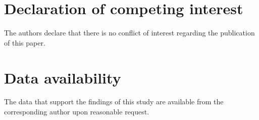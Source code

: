 \documentclass[a4paper,fleqn]{cas-sc}
\theoremstyle{plain}
\theoremstyle{definition}
\begin{document}
\section*{Declaration of competing interest}
The authors declare that there is no conflict of interest regarding the publication of this paper.

%

\section*{Data availability}
The data that support the findings of this study are available from the corresponding author upon reasonable request.

%

%
%


\end{document}
